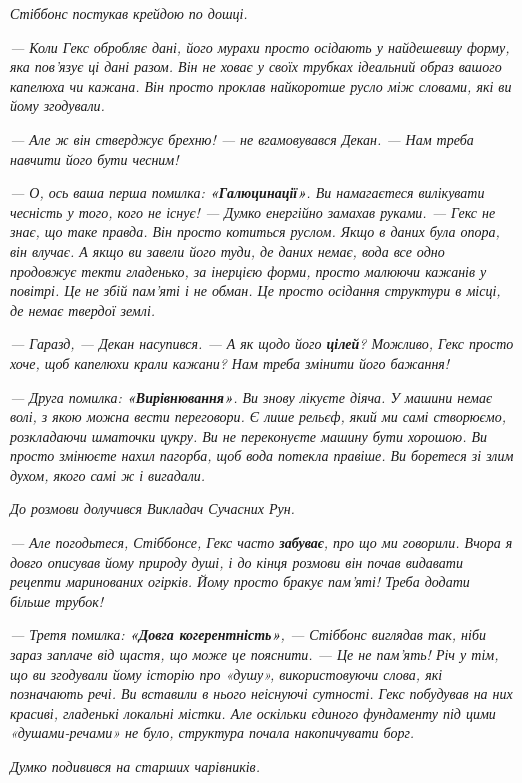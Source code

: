\documentclass[12pt, a4paper, openany]{book}
\begin{document}
\begin{terrybox}
\textit{Стіббонс постукав крейдою по дошці.}

\textit{--- Коли Гекс обробляє дані, його мурахи просто осідають у найдешевшу форму, яка пов'язує ці дані разом. Він не ховає у своїх трубках ідеальний образ вашого капелюха чи кажана. Він просто проклав найкоротше русло між словами, які ви йому згодували.}

\textit{--- Але ж він стверджує брехню! --- не вгамовувався Декан. --- Нам треба навчити його бути чесним!}

\textit{--- О, ось ваша перша помилка: \textbf{«Галюцинації»}. Ви намагаєтеся вилікувати чесність у того, кого не існує! --- Думко енергійно замахав руками. --- Гекс не знає, що таке правда. Він просто котиться руслом. Якщо в даних була опора, він влучає. А якщо ви завели його туди, де даних немає, вода все одно продовжує текти гладенько, за інерцією форми, просто малюючи кажанів у повітрі. Це не збій пам'яті і не обман. Це просто осідання структури в місці, де немає твердої землі.}

\textit{--- Гаразд, --- Декан насупився. --- А як щодо його \textbf{цілей}? Можливо, Гекс просто \emph{хоче}, щоб капелюхи крали кажани? Нам треба змінити його бажання!}

\textit{--- Друга помилка: \textbf{«Вирівнювання»}. Ви знову лікуєте діяча. У машини немає волі, з якою можна вести переговори. Є лише рельєф, який ми самі створюємо, розкладаючи шматочки цукру. Ви не переконуєте машину бути хорошою. Ви просто змінюєте нахил пагорба, щоб вода потекла правіше. Ви боретеся зі злим духом, якого самі ж і вигадали.}

\textit{До розмови долучився Викладач Сучасних Рун.}

\textit{--- Але погодьтеся, Стіббонсе, Гекс часто \textbf{забуває}, про що ми говорили. Вчора я довго описував йому природу душі, і до кінця розмови він почав видавати рецепти маринованих огірків. Йому просто бракує пам'яті! Треба додати більше трубок!}

\textit{--- Третя помилка: \textbf{«Довга когерентність»}, --- Стіббонс виглядав так, ніби зараз заплаче від щастя, що може це пояснити. --- Це не пам'ять! Річ у тім, що ви згодували йому історію про «душу», використовуючи слова, які позначають речі. Ви вставили в нього неіснуючі сутності. Гекс побудував на них красиві, гладенькі локальні містки. Але оскільки єдиного фундаменту під цими «душами-речами» не було, структура почала накопичувати борг.}

\textit{Думко подивився на старших чарівників.}


\end{terrybox}
\end{document}
